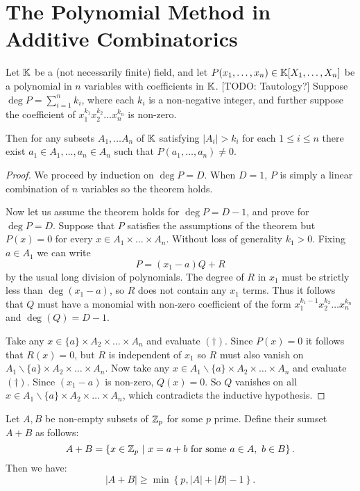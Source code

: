 \chapter{The Polynomial Method in Additive Combinatorics}

\begin{theorem}
    Let $\mathbb K$ be a (not necessarily finite) field, and let $P(x_1,\dots, x_n) \in \mathbb K[X_1,\dots, X_n]$ be a polynomial in $n$ variables with coefficients in $\mathbb K$. [TODO: Tautology?] Suppose $\deg P = \sum_{i=1}^n k_i$, where each $k_i$ is a non-negative
    integer, and further suppose the coefficient of $x_1^{k_1}x_2^{k_2}\dots x_n^{k_n}$ is non-zero.

    Then for any subsets $A_1,\dots A_n$ of $\mathbb K$ satisfying $|A_i| > k_i$ for each $1\leq i\leq n$ there exist $a_1 \in A_1, \dots, a_n \in A_n$ such that $P(a_1,\dots, a_n) \neq 0$.
    \label{comb-nullstellensatz}
\end{theorem}
\begin{proof}
    We proceed by induction on $\deg P = D$. When $D=1$, $P$ is simply a linear combination of $n$ variables so the theorem holds.

    Now let us assume the theorem holds for $\deg P = D -1$, and prove for $\deg P = D$.
    Suppose that $P$ satisfies the assumptions of the theorem but $P(x) = 0$ for every $x \in A_1 \times \dots \times A_n$.
    Without loss of generality $k_1 > 0.$ Fixing $a\in A_1$ we can write
    \[
    P = (x_1-a)Q +R  \tag{$\dagger$}
    \]
    by the usual long division of polynomials. The degree of $R$ in $x_1$ must be strictly less than $\deg(x_1-a)$, so $R$ does not contain any
    $x_1$ terms. Thus it follows that $Q$ must have a monomial with non-zero coefficient of the form $x_1^{k_{1} -1} x_2^{k_2} \dots x_n^{k_n}$ and 
    $\deg (Q) = D-1$.

    Take any $x \in \{a\} \times A_2 \times \dots \times A_n$ and evaluate $(\dagger)$. Since $P(x) = 0$ it follows that $R(x) = 0$, but $R$ is independent of $x_1$ so $R$ must also vanish on $A_1 \backslash \{a\} \times A_2 \times \dots \times A_n$.
    Now take any $x \in A_1 \backslash \{a\} \times A_2 \times \dots \times A_n$ and evaluate $(\dagger)$. Since $(x_1 - a)$ is non-zero, $Q(x) =0$. So $Q$ vanishes on all $x \in A_1 \backslash \{a\} \times A_2 \times \dots \times A_n$, which contradicts the inductive hypothesis.
\end{proof}

\begin{theorem} 
    Let $A,B$ be non-empty subsets of $\mathbb Z_p$ for some $p$ prime. Define their sumset $A+B$ as follows:
    \[
    A + B = 
    \left\{ x \in \mathbb Z_p\ | \ x = a+b \text{  for some } a\in A, \ b \in B \right\}.
    \]
    Then we have:
    \[
    |A+B| \geq  \min \left\{p, |A| + |B| -1 \right\}.
    \]
\end{theorem}


